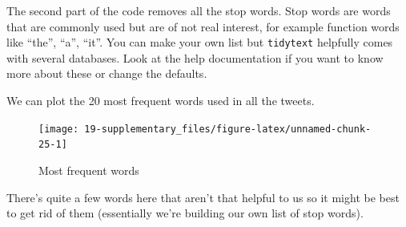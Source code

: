 \documentclass[]{book}
\newenvironment{Shaded}{\begin{snugshade}}{\end{snugshade}}
\newcommand{\CommentTok}[1]{\textcolor[rgb]{0.56,0.35,0.01}{\textit{#1}}}
\newcommand{\DataTypeTok}[1]{\textcolor[rgb]{0.13,0.29,0.53}{#1}}
\newcommand{\DecValTok}[1]{\textcolor[rgb]{0.00,0.00,0.81}{#1}}
\newcommand{\KeywordTok}[1]{\textcolor[rgb]{0.13,0.29,0.53}{\textbf{#1}}}
\newcommand{\NormalTok}[1]{#1}
\newcommand{\OperatorTok}[1]{\textcolor[rgb]{0.81,0.36,0.00}{\textbf{#1}}}
\newcommand{\OtherTok}[1]{\textcolor[rgb]{0.56,0.35,0.01}{#1}}
\newcommand{\StringTok}[1]{\textcolor[rgb]{0.31,0.60,0.02}{#1}}
\begin{document}
The second part of the code removes all the stop words. Stop words are words that are commonly used but are of not real interest, for example function words like ``the'', ``a'', ``it''. You can make your own list but \texttt{tidytext} helpfully comes with several databases. Look at the help documentation if you want to know more about these or change the defaults.

\begin{Shaded}
\end{Shaded}

We can plot the 20 most frequent words used in all the tweets.

\begin{Shaded}
\end{Shaded}

\begin{figure}

{\centering \texttt{[image: 19-supplementary\_files/figure-latex/unnamed-chunk-25-1]} 

}

\caption{Most frequent words}\label{fig:unnamed-chunk-25}
\end{figure}

There's quite a few words here that aren't that helpful to us so it might be best to get rid of them (essentially we're building our own list of stop words).
\end{document}
